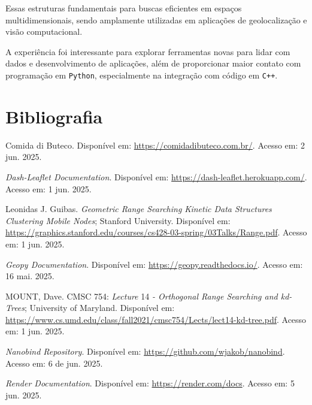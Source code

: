 \documentclass{article}
\begin{document}
\begin{adjustwidth}{-1.5cm}{-1.5cm}
Essas estruturas fundamentais para buscas eficientes em espaços multidimensionais, sendo amplamente utilizadas em aplicações de geolocalização e visão computacional.

A experiência foi interessante para explorar ferramentas novas para lidar com dados e desenvolvimento de aplicações, além de proporcionar maior contato com programação em \texttt{Python}, especialmente na integração com código em \texttt{C++}.

\newpage
\section{Bibliografia}

\begin{thebibliography}{99}

Comida di Buteco. Disponível em: \url{https://comidadibuteco.com.br/}. Acesso em: 2 jun. 2025.


\textit{Dash-Leaflet Documentation}. Disponível em: \url{https://dash-leaflet.herokuapp.com/}. Acesso em: 1 jun. 2025.

Leonidas J. Guibas. \textit{Geometric Range Searching
Kinetic Data Structures
Clustering Mobile Nodes}; Stanford University. Disponível em: \url{https://graphics.stanford.edu/courses/cs428-03-spring/03Talks/Range.pdf}. Acesso em: 1 jun. 2025.

\textit{Geopy Documentation}. Disponível em: \url{https://geopy.readthedocs.io/}. Acesso em: 16 mai. 2025.

MOUNT, Dave. CMSC 754: \textit{Lecture} 14 \textit{- Orthogonal Range Searching and kd-Trees}; University of Maryland. Disponível em: \url{https://www.cs.umd.edu/class/fall2021/cmsc754/Lects/lect14-kd-tree.pdf}. Acesso em: 1 jun. 2025.

\textit{Nanobind Repository}. Disponível em: \url{https://github.com/wjakob/nanobind}. Acesso em: 6 de jun. 2025.

\textit{Render Documentation}. Disponível em: \url{https://render.com/docs}. Acesso em: 5 jun. 2025.


\end{thebibliography}
\end{adjustwidth}
\end{document}
